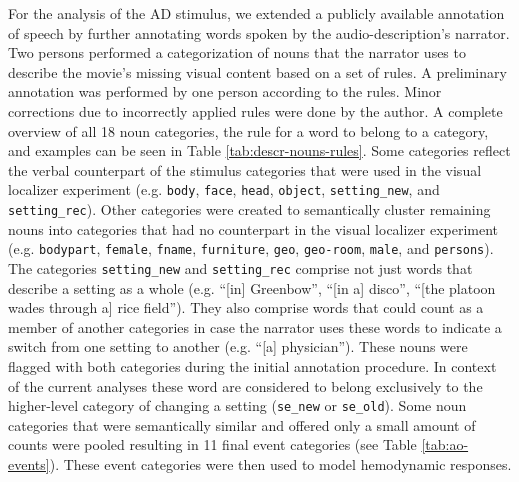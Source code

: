 \documentclass[english]{article}
\begin{document}
For the analysis of the AD stimulus, we extended a publicly available annotation
of speech \citep{haeusler2020speechanno} by further annotating words spoken by
the audio-description's narrator.
Two persons performed a categorization of nouns that the narrator uses to
describe the movie's missing visual content based on a set of rules.
A preliminary annotation was performed by one person according to the rules.
Minor corrections due to incorrectly applied rules were done by the author.
A complete overview of all 18 noun categories, the rule for a word to belong to
a category, and examples can be seen in Table \ref{tab:descr-nouns-rules}.
Some categories reflect the verbal counterpart of the stimulus categories that
were used in the visual localizer experiment (e.g. \texttt{body}, \texttt{face},
\texttt{head}, \texttt{object}, \texttt{setting\_new}, and
\texttt{setting\_rec}).
Other categories were created to semantically cluster remaining nouns into
categories that had no counterpart in the visual localizer experiment (e.g.
\texttt{bodypart}, \texttt{female}, \texttt{fname}, \texttt{furniture},
\texttt{geo}, \texttt{geo-room}, \texttt{male}, and \texttt{persons}).
The categories \texttt{setting\_new} and \texttt{setting\_rec} comprise not just
words that describe a setting as a whole (e.g. ``[in] Greenbow'', ``[in a]
disco'', ``[the platoon wades through a] rice field''). They also comprise words
that could count as a member of another categories in case the narrator uses
these words to indicate a switch from one setting to another (e.g. ``[a]
physician'').
These nouns were flagged with both categories during the initial annotation
procedure. In context of the current analyses these word are considered to
belong exclusively to the higher-level category of changing a setting
(\texttt{se\_new} or \texttt{se\_old}).
Some noun categories that were semantically similar and offered only a
small amount of counts were pooled resulting in 11 final event categories (see
Table \ref{tab:ao-events}). These event categories were then used to model
hemodynamic responses.
\end{document}
